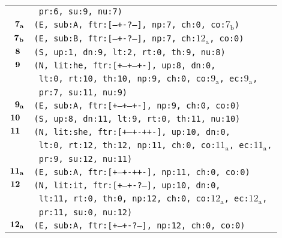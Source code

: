\documentclass{article}
\begin{document}
\begin{minipage}{\textwidth}
{\begin{tabular}{|r|l|}
    & \texttt{\texttt{~pr:6,~su:9,~nu:7)}} \\
    ${\textbf{\textrm{7}}_{\textbf{\textrm{a}}}}$ & \texttt{\texttt{(E,~sub:A,~ftr:[---+-?--],~np:7,~ch:0,~co:${\textrm{7}_{\textrm{b}}}$)}} \\
    ${\textbf{\textrm{7}}_{\textbf{\textrm{b}}}}$ & \texttt{\texttt{(E,~sub:B,~ftr:[---+-?--],~np:7,~ch:${\textrm{12}_{\textrm{a}}}$,~co:0)}} \\
    ${\textbf{\textrm{8}}_{\phantom{z}}}$ & \texttt{\texttt{(S,~up:1,~dn:9,~lt:2,~rt:0,~th:9,~nu:8)}} \\
    ${\textbf{\textrm{9}}_{\phantom{z}}}$ & \texttt{\texttt{(N,~lit:he,~ftr:[+--+--+-],~up:8,~dn:0,}} \\
    & \texttt{\texttt{~lt:0,~rt:10,~th:10,~np:9,~ch:0,~co:${\textrm{9}_{\textrm{a}}}$,~ec:${\textrm{9}_{\textrm{a}}}$,}} \\
    & \texttt{\texttt{~pr:7,~su:11,~nu:9)}} \\
    ${\textbf{\textrm{9}}_{\textbf{\textrm{a}}}}$ & \texttt{\texttt{(E,~sub:A,~ftr:[+--+--+-],~np:9,~ch:0,~co:0)}} \\
    ${\textbf{\textrm{10}}_{\phantom{z}}}$ & \texttt{\texttt{(S,~up:8,~dn:11,~lt:9,~rt:0,~th:11,~nu:10)}} \\
    ${\textbf{\textrm{11}}_{\phantom{z}}}$ & \texttt{\texttt{(N,~lit:she,~ftr:[+--+-++-],~up:10,~dn:0,}} \\
    & \texttt{\texttt{~lt:0,~rt:12,~th:12,~np:11,~ch:0,~co:${\textrm{11}_{\textrm{a}}}$,~ec:${\textrm{11}_{\textrm{a}}}$,}} \\
    & \texttt{\texttt{~pr:9,~su:12,~nu:11)}} \\
    ${\textbf{\textrm{11}}_{\textbf{\textrm{a}}}}$ & \texttt{\texttt{(E,~sub:A,~ftr:[+--+-++-],~np:11,~ch:0,~co:0)}} \\
    ${\textbf{\textrm{12}}_{\phantom{z}}}$ & \texttt{\texttt{(N,~lit:it,~ftr:[+--+-?--],~up:10,~dn:0,}} \\
    & \texttt{\texttt{~lt:11,~rt:0,~th:0,~np:12,~ch:0,~co:${\textrm{12}_{\textrm{a}}}$,~ec:${\textrm{12}_{\textrm{a}}}$,}} \\
    & \texttt{\texttt{~pr:11,~su:0,~nu:12)}} \\
    ${\textbf{\textrm{12}}_{\textbf{\textrm{a}}}}$ & \texttt{\texttt{(E,~sub:A,~ftr:[+--+-?--],~np:12,~ch:0,~co:0)}} \\
    \hline
  \end{tabular}
  }
\end{minipage}
\bigbreak
\end{document}

